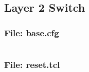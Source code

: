 \documentclass{article}
\begin{document}

\subsection{Layer 2 Switch}
\subsubsection{File: base.cfg}
\inputminted[frame=lines,framesep=2mm,baselinestretch=1.2,bgcolor=lightgray,fontsize=\footnotesize,linenos,breaklines=true]{tcl}{code/l2switch/base.cfg}
\subsubsection{File: reset.tcl}
\inputminted[frame=lines,framesep=2mm,baselinestretch=1.2,bgcolor=lightgray,fontsize=\footnotesize,linenos,breaklines=true]{tcl}{code/l2switch/reset.tcl}

%
%




%
%
\end{document}
